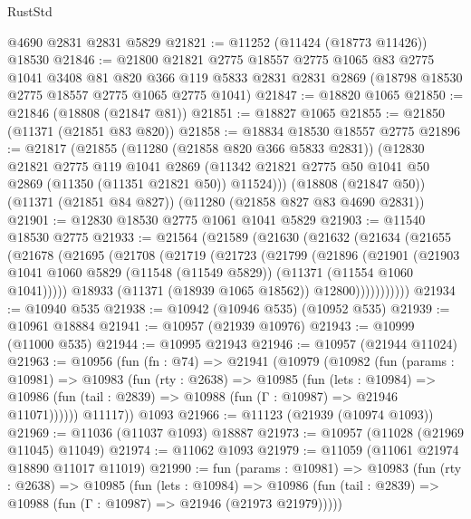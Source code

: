 \begin{lexlean}{RustStd}
\begin{coremodule}
    @4690
    @2831
    @2831
    @5829
@21821 := @11252 (@11424 (@18773 @11426)) @18530
@21846 := @21800
    @21821
    @2775
    @18557
    @2775
    @1065
    @83
    @2775
    @1041
    @3408
    @81
    @820
    @366
    @119
    @5833
    @2831
    @2831
    @2869
    (@18798 @18530 @2775 @18557 @2775 @1065 @2775 @1041)
@21847 := @18820 @1065
@21850 := @21846 (@18808 (@21847 @81))
@21851 := @18827 @1065
@21855 := @21850 (@11371 (@21851 @83 @820))
@21858 := @18834 @18530 @18557 @2775
@21896 := @21817
    (@21855
      (@11280 (@21858 @820 @366 @5833 @2831))
      (@12830
        @21821
        @2775
        @119
        @1041
        @2869
        (@11342 @21821 @2775 @50 @1041 @50 @2869 (@11350 (@11351 @21821 @50)) @11524)))
    (@18808 (@21847 @50))
    (@11371 (@21851 @84 @827))
    (@11280 (@21858 @827 @83 @4690 @2831))
@21901 := @12830 @18530 @2775 @1061 @1041 @5829
@21903 := @11540 @18530 @2775
@21933 := @21564
    (@21589
      (@21630
        (@21632
          (@21634
            (@21655
              (@21678
                (@21695
                  (@21708
                    (@21719
                      (@21723
                        (@21799
                          (@21896
                            (@21901
                              (@21903
                                @1041
                                @1060
                                @5829
                                (@11548 (@11549 @5829))
                                (@11371 (@11554 @1060 @1041)))))
                          @18933
                          (@11371 (@18939 @1065 @18562))
                          @12800)))))))))))
@21934 := @10940 @535
@21938 := @10942 (@10946 @535) (@10952 @535)
@21939 := @10961 @18884
@21941 := @10957 (@21939 @10976)
@21943 := @10999 (@11000 @535)
@21944 := @10995 @21943
@21946 := @10957 (@21944 @11024)
@21963 := @10956
    (fun (fn : @74) =>
    @21941
      (@10979
        (@10982
          (fun (params : @10981) =>
          @10983
            (fun (rty : @2638) =>
            @10985
              (fun (lets : @10984) =>
              @10986 (fun (tail : @2839) => @10988 (fun (Γ : @10987) => @21946 @11071))))))
        @11117))
    @1093
@21966 := @11123 (@21939 (@10974 @1093))
@21969 := @11036 (@11037 @1093) @18887
@21973 := @10957 (@11028 (@21969 @11045) @11049)
@21974 := @11062 @1093
@21979 := @11059 (@11061 @21974 @18890 @11017 @11019)
@21990 := fun (params : @10981) =>
  @10983
    (fun (rty : @2638) =>
    @10985
      (fun (lets : @10984) =>
      @10986 (fun (tail : @2839) => @10988 (fun (Γ : @10987) => @21946 (@21973 @21979)))))

\end{coremodule}
\end{lexlean}
